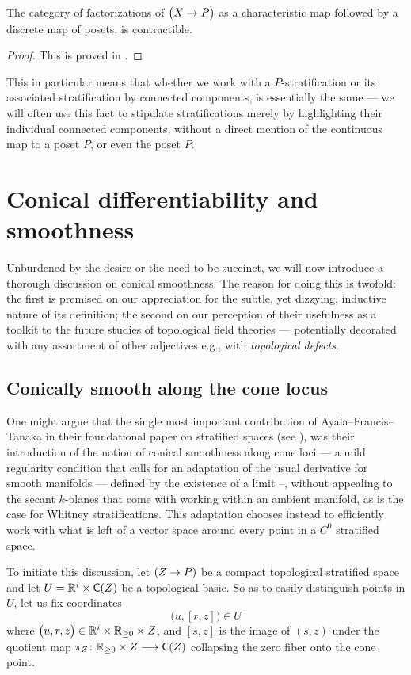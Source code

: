 \begin{lemma}
    The category of factorizations of $\big(X \rightarrow P\big)$ as a characteristic map followed by a discrete map of posets, is contractible.
\end{lemma}
\begin{proof}
  This is proved in \cite[Lemma B.37]{DD21}.   
\end{proof}
\medskip

\nid This in particular means that whether we work with a $P$-stratification or its associated stratification by connected components, is essentially the same — we will often use this fact to stipulate stratifications merely by highlighting their individual connected components, without a direct mention of the continuous map to a poset $P$, or even the poset $P$.

\section{Conical differentiability and smoothness}

Unburdened by the desire or the need to be succinct, we will now introduce a thorough discussion on conical smoothness. The reason for doing this is twofold: the first is premised on our appreciation for the subtle, yet dizzying, inductive nature of its definition; the second on our perception of their usefulness as a toolkit to the future studies of topological field theories — potentially decorated with any assortment of other adjectives e.g., with \emph{topological defects}.  

\subsection{Conically smooth along the cone locus}
One might argue that the single most important contribution of Ayala--Francis--Tanaka in their foundational paper on stratified spaces (see \cite{AFT1}), was their introduction of the notion of conical smoothness along cone loci — a mild regularity condition that calls for an adaptation of the usual derivative for smooth manifolds — defined by the existence of a limit --, without appealing to the secant $k$-planes that come with working within an ambient manifold, as is the case for Whitney stratifications. This adaptation chooses instead to efficiently work with what is left of a vector space around every point in a $C^{0}$ stratified space. 

To initiate this discussion, let $(Z\rightarrow P)$ be a compact topological stratified space and let $U = \mathbb R^{i} \times \mathsf C(Z)$ be a topological basic. So as to easily distinguish points in $U$, let us fix coordinates
\begin{equation}
    \big(u,[r,z]\big) \in U
\end{equation}
where $\big( u,r,z \big)\in \mathbb R^{i} \times \mathbb R_{\geq 0} \times Z$, and $[s,z]$ is the image of $(s,z)$ under the quotient map $\pi_Z \colon \mathbb R_{\geq 0} \times Z \longrightarrow \mathsf C(Z)$ collapsing the zero fiber onto the cone point. 

